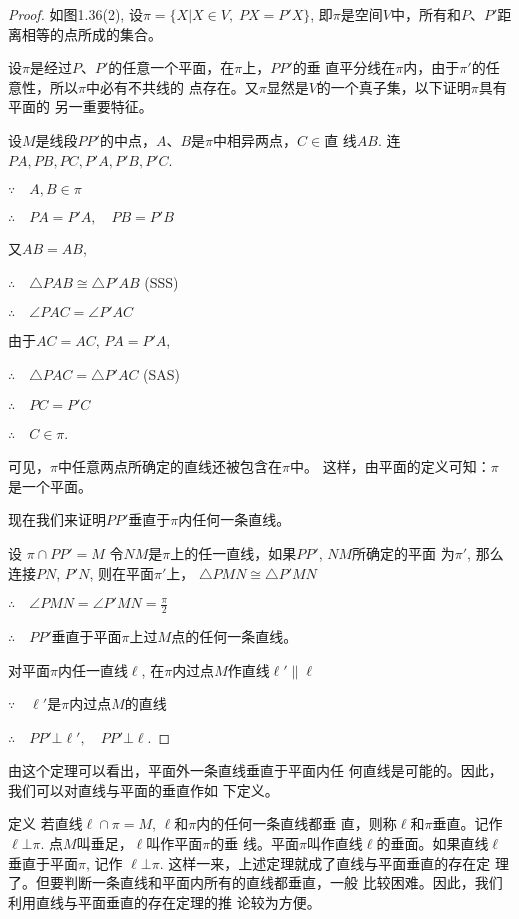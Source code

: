 \begin{proof}
如图1.36(2), 设$\pi=\{X|X\in V,\; PX=P'X\}$, 
即$\pi$是空间$V$中，所有和$P$、$P'$距离相等的点所成的集合。

设$\pi$是经过$P$、$P'$的任意一个平面，在$\pi$上，$PP'$的垂
直平分线在$\pi$内，由于$\pi'$的任意性，所以$\pi$中必有不共线的
点存在。又$\pi$显然是$V$的一个真子集，以下证明$\pi$具有平面的
另一重要特征。

设$M$是线段$PP'$的中点，$A$、$B$是$\pi$中相异两点，$C\in$直
线$AB$. 连$PA,PB,PC,P'A,P'B,P'C$.

$\because\quad A,B\in\pi$

$\therefore\quad PA=P'A,\quad PB=P'B$

又$AB=AB$,

$\therefore\quad \triangle PAB\cong \triangle P'AB$ (SSS)

$\therefore\quad \angle PAC=\angle P'AC$

由于$AC=AC$, $PA=P'A$,

$\therefore\quad \triangle PAC=\triangle P'AC$ (SAS)

$\therefore\quad PC=P'C$

$\therefore\quad C\in\pi$.

可见，$\pi$中任意两点所确定的直线还被包含在$\pi$中。
这样，由平面的定义可知：$\pi$是一个平面。

现在我们来证明$PP'$垂直于$\pi$内任何一条直线。

设 $\pi\cap PP'=M$
令$NM$是$\pi$上的任一直线，如果$PP'$, $NM$所确定的平面
为$\pi'$, 那么连接$PN$, $P'N$, 则在平面$\pi'$上，
$\triangle PMN\cong \triangle P'MN$

$\therefore\quad \angle PMN=\angle P'MN=\frac{\pi}{2}$

$\therefore\quad PP'$垂直于平面$\pi$上过$M$点的任何一条直线。

对平面$\pi$内任一直线$\ell$, 在$\pi$内过点$M$作直线$\ell'\parallel \ell$

$\because\quad \ell'$是$\pi$内过点$M$的直线

$\therefore\quad PP'\bot \ell',\quad PP'\bot \ell$.
\end{proof}

由这个定理可以看出，平面外一条直线垂直于平面内任
何直线是可能的。因此，我们可以对直线与平面的垂直作如
下定义。

\begin{blk}
  {定义} 若直线$\ell\cap \pi=M$, $\ell$和$\pi$内的任何一条直线都垂
直，则称$\ell$和$\pi$垂直。记作$\ell\bot \pi$. 点$M$叫垂足，$\ell$叫作平面$\pi$的垂
线。平面$\pi$叫作直线$\ell$的垂面。如果直线$\ell$垂直于平面$\pi$, 记作
$\ell\bot \pi$. 这样一来，上述定理就成了直线与平面垂直的存在定
理了。但要判断一条直线和平面内所有的直线都垂直，一般
比较困难。因此，我们利用直线与平面垂直的存在定理的推
论较为方便。
\end{blk}


